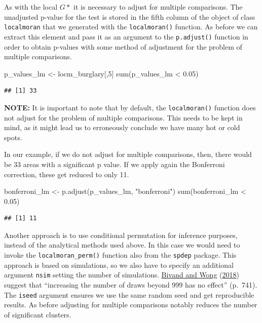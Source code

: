 \documentclass[
  krantz2]{krantz}
\makeatletter
\newenvironment{Shaded}{\begin{snugshade}}{\end{snugshade}}
\newcommand{\DecValTok}[1]{\textcolor[rgb]{0.06,0.06,0.06}{#1}}
\newcommand{\FloatTok}[1]{\textcolor[rgb]{0.06,0.06,0.06}{#1}}
\newcommand{\FunctionTok}[1]{\textcolor[rgb]{0,0,0}{#1}}
\newcommand{\NormalTok}[1]{#1}
\newcommand{\OtherTok}[1]{\textcolor[rgb]{0.37,0.37,0.37}{#1}}
\newcommand{\SpecialCharTok}[1]{\textcolor[rgb]{0,0,0}{#1}}
\newcommand{\StringTok}[1]{\textcolor[rgb]{0.5,0.5,0.5}{#1}}
\newenvironment{kframe}{%
\medskip{}
\setlength{\fboxsep}{.8em}
 \def\at@end@of@kframe{}%
 \ifinner\ifhmode%
  \def\at@end@of@kframe{\end{minipage}}%
  \begin{minipage}{\columnwidth}%
 \fi\fi%
 \def\FrameCommand##1{\hskip\@totalleftmargin \hskip-\fboxsep
 \colorbox{shadecolor}{##1}\hskip-\fboxsep
     \hskip-\linewidth \hskip-\@totalleftmargin \hskip\columnwidth}%
 \MakeFramed {\advance\hsize-\width
   \@totalleftmargin\z@ \linewidth\hsize
   \@setminipage}}%
 {\par\unskip\endMakeFramed%
 \at@end@of@kframe}
\renewenvironment{Shaded}{\begin{kframe}}{\end{kframe}}
\makeatother
\begin{document}
As with the local \(G*\) it is necessary to adjust for multiple comparisons. The unadjusted p-value for the test is stored in the fifth column of the object of class \texttt{localmoran} that we generated with the \texttt{localmoran()} function. As before we can extract this element and pass it as an argument to the \texttt{p.adjust()} function in order to obtain p-values with some method of adjustment for the problem of multiple comparisons.

\begin{Shaded}
\begin{Highlighting}[]
\NormalTok{p\_values\_lm }\OtherTok{\textless{}{-}}\NormalTok{ locm\_burglary[,}\DecValTok{5}\NormalTok{]}
\FunctionTok{sum}\NormalTok{(p\_values\_lm }\SpecialCharTok{\textless{}} \FloatTok{0.05}\NormalTok{)}
\end{Highlighting}
\end{Shaded}

\begin{verbatim}
## [1] 33
\end{verbatim}

\textbf{NOTE:} It is important to note that by default, the \texttt{localmoran()} function does not adjust for the problem of multiple comparisons. This needs to be kept in mind, as it might lead us to erroneously conclude we have many hot or cold spots.

In our example, if we do not adjust for multiple comparisons, then, there would be 33 areas with a significant p value. If we apply again the Bonferroni correction, these get reduced to only 11.

\begin{Shaded}
\begin{Highlighting}[]
\NormalTok{bonferroni\_lm }\OtherTok{\textless{}{-}} \FunctionTok{p.adjust}\NormalTok{(p\_values\_lm, }\StringTok{"bonferroni"}\NormalTok{)}
\FunctionTok{sum}\NormalTok{(bonferroni\_lm }\SpecialCharTok{\textless{}} \FloatTok{0.05}\NormalTok{)}
\end{Highlighting}
\end{Shaded}

\begin{verbatim}
## [1] 11
\end{verbatim}

Another approach is to use conditional permutation for inference purposes, instead of the analytical methods used above. In this case we would need to invoke the \texttt{localmoran\_perm()} function also from the \texttt{spdep} package. This approach is based on simulations, so we also have to specify an additional argument \texttt{nsim} setting the number of simulations. \protect\hyperlink{ref-Bivand_2018}{Bivand and Wong} (\protect\hyperlink{ref-Bivand_2018}{2018}) suggest that ``increasing the number of draws beyond 999 has no effect'' (p.~741). The \texttt{iseed} argument ensures we use the same random seed and get reproducible results. As before adjusting for multiple comparisons notably reduces the number of significant clusters.
\end{document}
